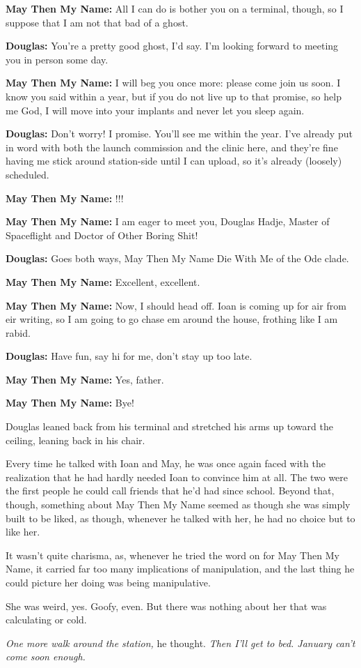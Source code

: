\textbf{May Then My Name:} All I can do is bother you on a terminal, though, so I suppose that I am not that bad of a ghost.

\textbf{Douglas:} You're a pretty good ghost, I'd say. I'm looking forward to meeting you in person some day.

\textbf{May Then My Name:} I will beg you once more: please come join us soon. I know you said within a year, but if you do not live up to that promise, so help me God, I will move into your implants and never let you sleep again.

\textbf{Douglas:} Don't worry! I promise. You'll see me within the year. I've already put in word with both the launch commission and the clinic here, and they're fine having me stick around station-side until I can upload, so it's already (loosely) scheduled.

\textbf{May Then My Name:} !!!

\textbf{May Then My Name:} I am eager to meet you, Douglas Hadje, Master of Spaceflight and Doctor of Other Boring Shit!

\textbf{Douglas:} Goes both ways, May Then My Name Die With Me of the Ode clade.

\textbf{May Then My Name:} Excellent, excellent.

\textbf{May Then My Name:} Now, I should head off. Ioan is coming up for air from eir writing, so I am going to go chase em around the house, frothing like I am rabid.

\textbf{Douglas:} Have fun, say hi for me, don't stay up too late.

\textbf{May Then My Name:} Yes, father.

\textbf{May Then My Name:} Bye!

Douglas leaned back from his terminal and stretched his arms up toward the ceiling, leaning back in his chair.

Every time he talked with Ioan and May, he was once again faced with the realization that he had hardly needed Ioan to convince him at all. The two were the first people he could call friends that he'd had since school. Beyond that, though, something about May Then My Name seemed as though she was simply built to be liked, as though, whenever he talked with her, he had no choice but to like her.

It wasn't quite charisma, as, whenever he tried the word on for May Then My Name, it carried far too many implications of manipulation, and the last thing he could picture her doing was being manipulative.

She was weird, yes. Goofy, even. But there was nothing about her that was calculating or cold.

\emph{One more walk around the station,} he thought. \emph{Then I'll get to bed. January can't come soon enough.}
